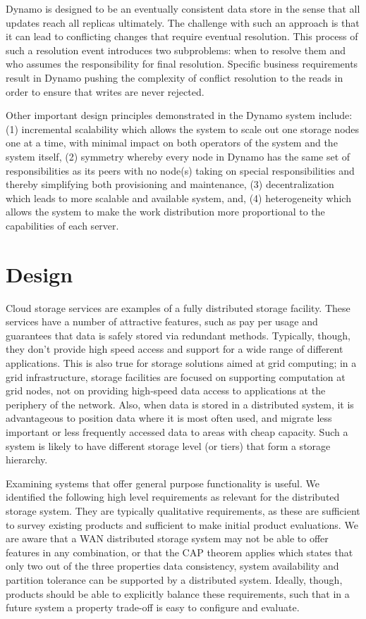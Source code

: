 \documentclass[11pt]{article}
\begin{document}
Dynamo is designed to be an eventually consistent data store in the
sense that all updates reach all replicas ultimately. The challenge
with such an approach is that it can lead to conflicting changes that
require eventual resolution. This process of such a resolution event
introduces two subproblems: when to resolve them and who assumes the
responsibility for final resolution. Specific business requirements
result in Dynamo pushing the complexity of conflict resolution to the
reads in order to ensure that writes are never rejected.

Other important design principles demonstrated in the Dynamo system
include: (1) incremental scalability which allows the system to scale
out one storage nodes one at a time, with minimal impact on both
operators of the system and the system itself, (2) symmetry whereby
every node in Dynamo has the same set of responsibilities as its peers
with no node(s) taking on special responsibilities and thereby
simplifying both provisioning and maintenance, (3) decentralization
which leads to more scalable and available system, and, (4)
heterogeneity which allows the system to make the work distribution
more proportional to the capabilities of each server.


\section{Design}

Cloud storage services are examples of a fully distributed storage 
facility. These services have a number of attractive features, such 
as pay per usage and guarantees that data is safely stored via 
redundant methods. Typically, though, they don't provide high speed 
access and support for a wide range of different applications. This 
is also true for storage solutions aimed at grid computing; in a grid 
infrastructure, storage facilities are focused on supporting computation 
at grid nodes, not on providing high-speed data access to applications at 
the periphery  of the network.  Also, when data is stored in a distributed 
system, it is advantageous to position data where it is most often used, 
and migrate less important or less frequently accessed data to areas with 
cheap capacity. Such a system is likely to have different storage level 
(or tiers) that form a storage hierarchy. 

Examining systems that offer general purpose functionality is useful. We 
identified the following high level requirements as relevant for the 
distributed storage system. They are typically qualitative requirements, 
as these are sufficient to survey existing products and sufficient to make 
initial product evaluations. We are aware that a WAN distributed storage 
system may not be able to offer features in any combination, or that the 
CAP theorem applies which states that only two out of the three properties 
data consistency, system availability and partition tolerance can be 
supported by a distributed system. Ideally, though, products should be able 
to explicitly balance these requirements, such that in a future system a 
property trade-off is easy to configure and evaluate.
\end{document}
